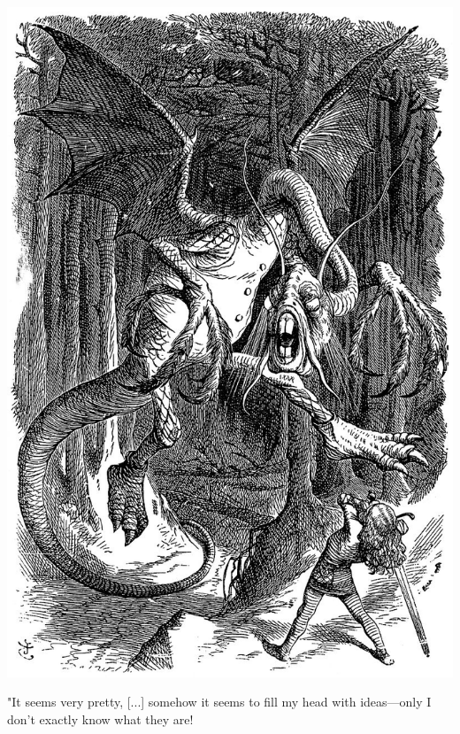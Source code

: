 \documentclass[openany,twoside,frontopenright]{ip3thesis}
\begin{document}
\begin{epigraph*}

\begin{center}
\centering 
\includegraphics[width=1\textwidth]{img/Jabberwocky.jpg}

	"It seems very pretty, [...] somehow it seems to fill my head with ideas—only I don't exactly know what they are!
\end{center}
\end{epigraph*}
\end{document}
